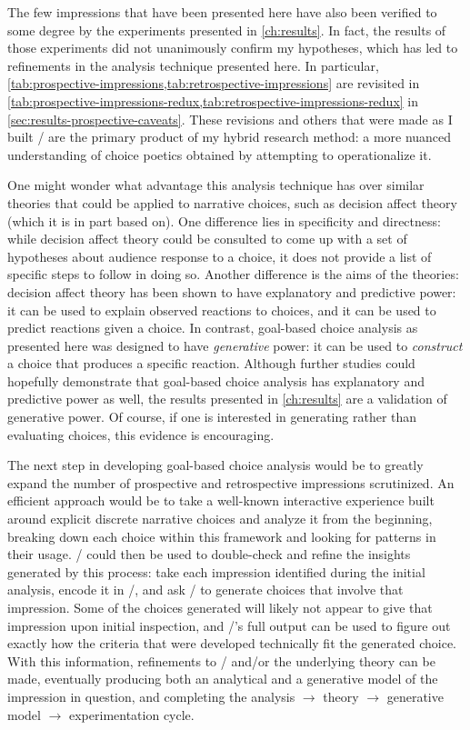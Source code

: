 The few impressions that have been presented here have also been verified to some degree by the experiments presented in \cref{ch:results}.
%
In fact, the results of those experiments did not unanimously confirm my hypotheses, which has led to refinements in the analysis technique presented here.
%
In particular, \cref{tab:prospective-impressions,tab:retrospective-impressions} are revisited in \cref{tab:prospective-impressions-redux,tab:retrospective-impressions-redux} in \cref{sec:results-prospective-caveats}.
%
These revisions and others that were made as I built \dunyazad/ are the primary product of my hybrid research method: a more nuanced understanding of choice poetics obtained by attempting to operationalize it.


One might wonder what advantage this analysis technique has over similar theories that could be applied to narrative choices, such as decision affect theory (which it is in part based on).
%
One difference lies in specificity and directness: while decision affect theory could be consulted to come up with a set of hypotheses about audience response to a choice, it does not provide a list of specific steps to follow in doing so.
%
Another difference is the aims of the theories: decision affect theory has been shown to have explanatory and predictive power: it can be used to explain observed reactions to choices, and it can be used to predict reactions given a choice.
%
In contrast, goal-based choice analysis as presented here was designed to have \emph{generative} power: it can be used to \emph{construct} a choice that produces a specific reaction.
%
Although further studies could hopefully demonstrate that goal-based choice analysis has explanatory and predictive power as well, the results presented in \cref{ch:results} are a validation of generative power.
%
Of course, if one is interested in generating rather than evaluating choices, this evidence is encouraging.


The next step in developing goal-based choice analysis would be to greatly expand the number of prospective and retrospective impressions scrutinized.
%
An efficient approach would be to take a well-known interactive experience built around explicit discrete narrative choices and analyze it from the beginning, breaking down each choice within this framework and looking for patterns in their usage.
%
\dunyazad/ could then be used to double-check and refine the insights generated by this process: take each impression identified during the initial analysis, encode it in \dunyazad/, and ask \dunyazad/ to generate choices that involve that impression.
%
Some of the choices generated will likely not appear to give that impression upon initial inspection, and \dunyazad/'s full output can be used to figure out exactly how the criteria that were developed technically fit the generated choice.
%
With this information, refinements to \dunyazad/ and/or the underlying theory can be made, eventually producing both an analytical and a generative model of the impression in question, and completing the analysis $\rightarrow$ theory $\rightarrow$ generative model $\rightarrow$ experimentation cycle.


